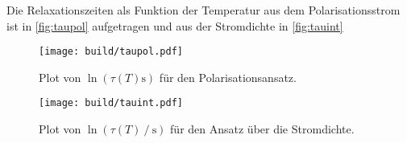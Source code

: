 Die Relaxationszeiten als Funktion der Temperatur aus dem Polarisationsstrom ist in \autoref{fig:taupol} aufgetragen und aus der Stromdichte in \autoref{fig:tauint} 
\begin{figure}[H]
    \centering
    \texttt{[image: build/taupol.pdf]}
    \caption{Plot von $\ln (\tau(T) \unit{\second})$ für den Polarisationsansatz.}
    \label{fig:taupol}
\end{figure}
\begin{figure}[H]
    \centering
    \texttt{[image: build/tauint.pdf]}
    \caption{Plot von $\ln (\tau(T)\mathbin{/} \unit{\second})$ für den Ansatz über die Stromdichte.}
    \label{fig:tauint}
\end{figure}